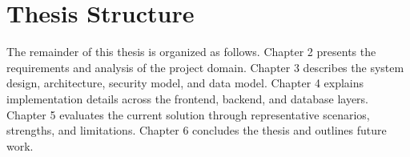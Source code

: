 \section{Thesis Structure}

The remainder of this thesis is organized as follows. Chapter 2 presents the requirements and analysis of the project domain. Chapter 3 describes the system design, architecture, security model, and data model. Chapter 4 explains implementation details across the frontend, backend, and database layers. Chapter 5 evaluates the current solution through representative scenarios, strengths, and limitations. Chapter 6 concludes the thesis and outlines future work.
